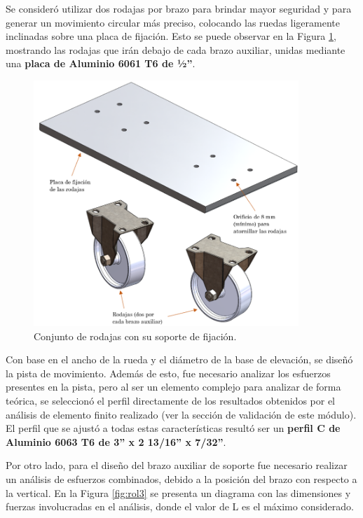 Se consideró utilizar dos rodajas por brazo para brindar mayor seguridad y para generar un movimiento circular más preciso, colocando las ruedas ligeramente inclinadas sobre una placa de fijación. Esto se puede observar en la Figura \ref{fig:rol2}, mostrando las rodajas que irán debajo de cada brazo auxiliar, unidas mediante una \textbf{placa de Aluminio 6061 T6 de ½”}.
\begin{figure}[H]
	\centering
	\includegraphics[width=10cm]{imagenes/rol2}
	\caption{Conjunto de rodajas con su soporte de fijación.}
	\label{fig:rol2}
\end{figure}

Con base en el ancho de la rueda y el diámetro de la base de elevación, se diseñó la pista de movimiento. Además de esto, fue necesario analizar los esfuerzos presentes en la pista, pero al ser un elemento complejo para analizar de forma teórica, se seleccionó el perfil directamente de los resultados obtenidos por el análisis de elemento finito realizado (ver la sección de validación de este módulo). El perfil que se ajustó a todas estas características resultó ser un \textbf{perfil C de Aluminio 6063 T6 de 3” x 2 13/16” x 7/32”}.

Por otro lado, para el diseño del brazo auxiliar de soporte fue necesario realizar un análisis de esfuerzos combinados, debido a la posición del brazo con respecto a la vertical. En la Figura \ref{fig:rol3} se presenta un diagrama con las dimensiones y fuerzas involucradas en el análisis, donde el valor de L es el máximo considerado.

